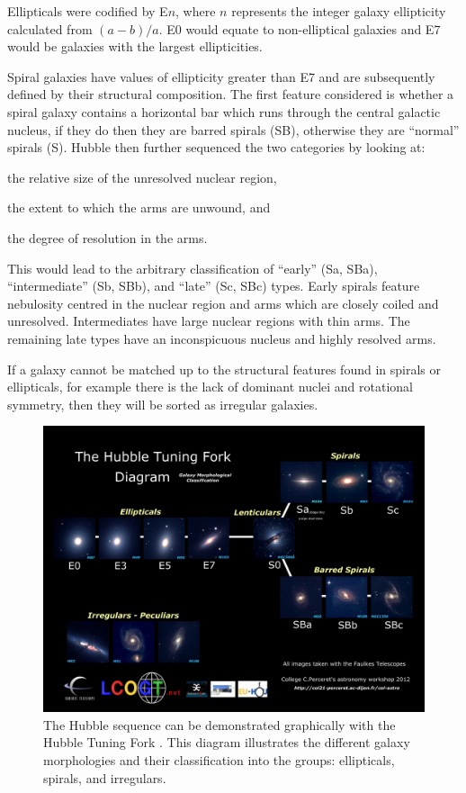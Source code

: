 \documentclass[12pt, twocolumn]{revtex4}    %
\begin{document}
Ellipticals were codified by E$n$, where $n$ represents the integer galaxy ellipticity calculated from $(a-b)/a$. E0 would equate to non-elliptical galaxies and E7 would be galaxies with the largest ellipticities. 

Spiral galaxies have values of ellipticity greater than E7 and are subsequently defined by their structural composition. The first feature considered is whether a spiral galaxy contains a horizontal bar which runs through the central galactic nucleus, if they do then they are barred spirals (SB), otherwise they are ``normal'' spirals (S). Hubble then further sequenced the two categories by looking at: 
\begin {enumerate*} [label=\itshape\alph*\upshape)]
\item the relative size of the unresolved nuclear region, \item the extent to which the arms are unwound, and \item the degree of resolution in the arms. 
\end {enumerate*} 
This would lead to the arbitrary classification of ``early'' (Sa, SBa), ``intermediate'' (Sb, SBb), and ``late'' (Sc, SBc) types. Early spirals feature nebulosity centred in the nuclear region and arms which are closely coiled and unresolved. Intermediates have large nuclear regions with thin arms. The remaining late types have an inconspicuous nucleus and highly resolved arms.  

If a galaxy cannot be matched up to the structural features found in spirals or ellipticals, for example there is the lack of dominant nuclei and rotational symmetry, then they will be sorted as irregular galaxies.

\begin{figure}
\includegraphics[width=\textwidth]{introduction/hubble-tuning-fork-diagram}
\captionsetup{justification=justified}
\caption[Hubble Tuning Fork]{The Hubble sequence can be demonstrated graphically with the Hubble Tuning Fork \citep{hubble_tuning_fork} . This diagram illustrates the different galaxy morphologies and their classification into the groups: ellipticals, spirals, and irregulars.}
\label{fig:hubble_tuning_fork}
\end{figure}
\end{document}
